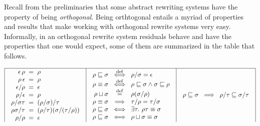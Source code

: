 
Recall from the preliminaries that some abstract rewriting systems have the property of being
\emph{orthogonal}.
Being orthtogonal entails a myriad of properties and results that make working
with orthogonal rewrite systems very easy.
Informally, in an orthogonal rewrite system residuals behave and have the properties
that one would expect, some of them are summarized in the table that follows.

{\footnotesize
\[
\begin{array}{|c|c|c|}
\hline
\begin{array}{r@{\hspace{0.2cm}}c@{\hspace{0.2cm}}l}
  \emptyDerivation\,\redseq & = & \redseq
\\
  \redseq\,\emptyDerivation & = & \redseq
\\
  \emptyDerivation/\redseq & = & \emptyDerivation
\\
  \redseq/\emptyDerivation & = & \redseq
\\
  \redseq/\redseqtwo\redseqthree & = & (\redseq/\redseqtwo)/\redseqthree
\\
  \redseq\redseqtwo/\redseqthree & = & (\redseq/\redseqthree)(\redseqtwo/(\redseqthree/\redseq))
\\
  \redseq/\redseq & = & \emptyDerivation
\end{array}
&
\begin{array}{r@{\hspace{0.2cm}}c@{\hspace{0.2cm}}l}
  \redseq \permle \redseqtwo & \iffdef & \redseq/\redseqtwo = \emptyDerivation
\\
  \redseq \permeq \redseqtwo & \iffdef & \redseq \permle \redseqtwo \land \redseqtwo \permle \redseq
\\
  \redseq \sqcup \redseqtwo  & \eqdef & \redseq(\redseqtwo/\redseq) 
\\
  \redseq \permeq \redseqtwo & \implies & \redseqthree/\redseq = \redseqthree/\redseqtwo
\\
  \redseq \permle \redseqtwo & \iff & \exists \redseqthree.\ \redseq\redseqthree \permeq \redseqtwo
\\
  \redseq \permle \redseqtwo & \iff & \redseq \sqcup \redseqtwo \permeq \redseqtwo
\end{array}
&
\begin{array}{r@{\hspace{0.2cm}}c@{\hspace{0.2cm}}l}
  \redseq \permle \redseqtwo & \implies & \redseq/\redseqthree \permle \redseqtwo/\redseqthree

\end{array}
\end{array}\]}
